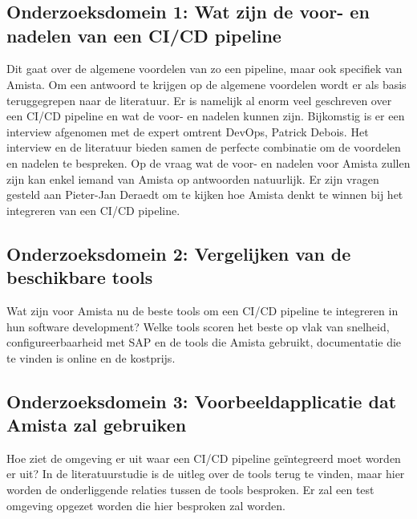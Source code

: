 
\chapter{}
\label{ch:methodologie}


\section{Onderzoeksdomein 1: Wat zijn de voor- en nadelen van een CI/CD pipeline}
\label{sec:onderzoeksdeel1}
Dit gaat over de algemene voordelen van zo een pipeline, maar ook specifiek van Amista. Om een antwoord te krijgen op de algemene voordelen wordt er als basis teruggegrepen naar de literatuur. Er is namelijk al enorm veel geschreven over een CI/CD pipeline en wat de voor- en nadelen kunnen zijn.
Bijkomstig is er een interview afgenomen met de expert omtrent DevOps, Patrick Debois.
Het interview en de literatuur bieden samen de perfecte combinatie om de voordelen en nadelen te bespreken.
Op de vraag wat de voor- en nadelen voor Amista zullen zijn kan enkel iemand van Amista op antwoorden natuurlijk. Er zijn vragen gesteld aan Pieter-Jan Deraedt om te kijken hoe Amista denkt te winnen bij het integreren van een CI/CD pipeline.

\section{Onderzoeksdomein 2: Vergelijken van de beschikbare tools}
\label{sec:onderzoeksdeel2}
Wat zijn voor Amista nu de beste tools om een CI/CD pipeline te integreren in hun software development? Welke tools scoren het beste op vlak van snelheid, configureerbaarheid met SAP en de tools die Amista gebruikt, documentatie die te vinden is online en de kostprijs. 

\section{Onderzoeksdomein 3: Voorbeeldapplicatie dat Amista zal gebruiken}
\label{sec:onderzoeksdeel3}
Hoe ziet de omgeving er uit waar een CI/CD pipeline geïntegreerd moet worden er uit? In de literatuurstudie is de uitleg over de tools terug te vinden, maar hier worden de onderliggende relaties tussen de tools besproken.
Er zal een test omgeving opgezet worden die hier besproken zal worden. 

